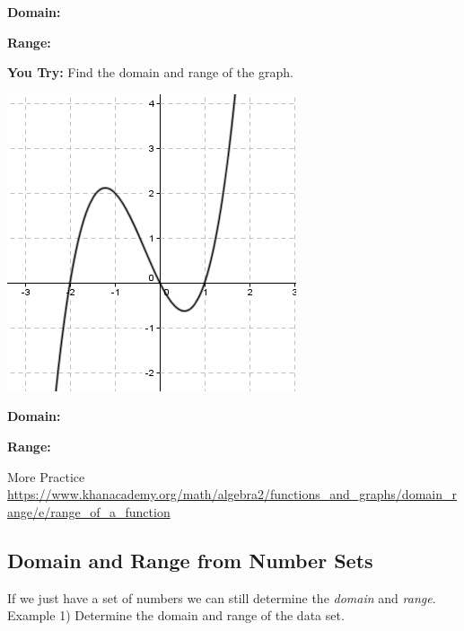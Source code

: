 \documentclass[12pt]{article}
\begin{document}
\textbf{Domain:}

\vspace{1cm}

\textbf{Range:}\\

\hrulefill

\textbf{You Try:} Find the domain and range of the graph.\\

\begin{center}
\includegraphics[scale=.5]{domain3.png}\\
\end{center}

\textbf{Domain:}

\vspace{1cm}

\textbf{Range:}\\

\hrulefill

More Practice\\

\url{https://www.khanacademy.org/math/algebra2/functions_and_graphs/domain_range/e/range_of_a_function}

\clearpage



\subsection{Domain and Range from Number Sets}

If we just have a set of numbers we can still determine the \textit{domain} and \textit{range}. \\

Example 1) Determine the domain and range of the data set.\\
\end{document}
